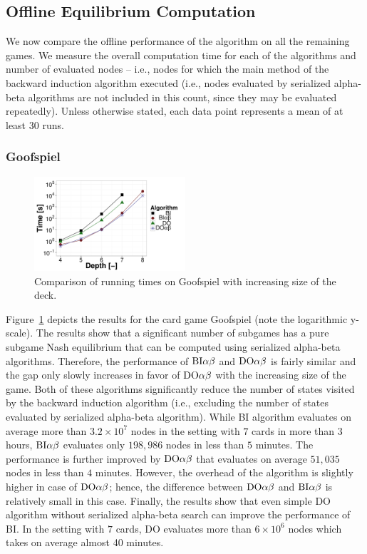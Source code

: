 \subsection{Offline Equilibrium Computation}

We now compare the offline performance of the algorithm on all the remaining games. 
We measure the overall computation time for each of the algorithms and number of evaluated nodes -- i.e., nodes for which the main method of the backward induction algorithm executed (i.e., nodes evaluated by serialized alpha-beta algorithms are not included in this count, since they may be evaluated repeatedly).
Unless otherwise stated, each data point represents a mean of at least $30$ runs.

\subsubsection{Goofspiel}
\begin{figure}
\centering
\includegraphics[width=0.5\textwidth]{figures/GS.pdf}
\caption{Comparison of running times on Goofspiel with increasing size of the deck.} \label{fig:off:res:gs}
\end{figure}

Figure~\ref{fig:off:res:gs} depicts the results for the card game Goofspiel (note the logarithmic y-scale).
The results show that a significant number of subgames has a pure subgame Nash equilibrium that can be computed using serialized alpha-beta algorithms.
Therefore, the performance of $\textrm{BI}\alpha\beta$ and $\textrm{DO}\alpha\beta$ is fairly similar and the gap only slowly increases in favor of $\textrm{DO}\alpha\beta$ with the increasing size of the game.
Both of these algorithms significantly reduce the number of states visited by the backward induction algorithm (i.e., excluding the number of states evaluated by serialized alpha-beta algorithm).
While \textsc{BI} algorithm evaluates on average more than $3.2\times10^7$ nodes in the setting with $7$ cards in more than $3$ hours, $\textrm{BI}\alpha\beta$ evaluates only $198,986$ nodes in less than $5$ minutes. 
The performance is further improved by $\textrm{DO}\alpha\beta$ that evaluates on average $51,035$ nodes in less than $4$ minutes.
However, the overhead of the algorithm is slightly higher in case of $\textrm{DO}\alpha\beta$; hence, the difference between $\textrm{DO}\alpha\beta$ and $\textrm{BI}\alpha\beta$ is relatively small in this case.
Finally, the results show that even simple \textsc{DO} algorithm without serialized alpha-beta search can improve the performance of \textsc{BI}.
In the setting with $7$ cards, \textsc{DO} evaluates more than $6\times10^6$ nodes which takes on average almost 40 minutes.

